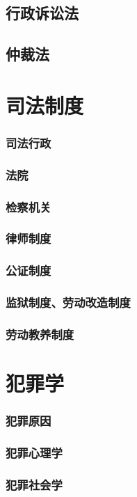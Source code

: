 \documentclass[UTF8]{../ApplicationUniverse}
\begin{document}
        \subsection{行政诉讼法}
        \subsection{仲裁法}


\section{司法制度}
        \subsubsection{司法行政}
        \subsubsection{法院}
        \subsubsection{检察机关}
        \subsubsection{律师制度}
        \subsubsection{公证制度}
        \subsubsection{监狱制度、劳动改造制度}
        \subsubsection{劳动教养制度}

\section{犯罪学}
        \subsubsection{犯罪原因}
        \subsubsection{犯罪心理学}
        \subsubsection{犯罪社会学}
\end{document}
